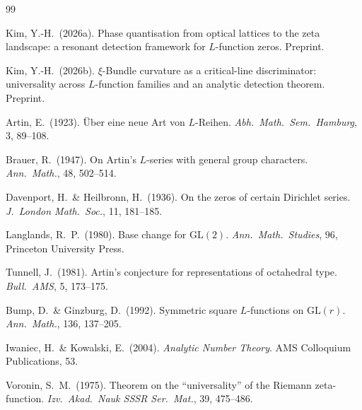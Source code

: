 \documentclass[11pt, a4paper]{article}
\theoremstyle{plain}
\theoremstyle{definition}
\begin{document}
\begin{thebibliography}{99}

  Kim, Y.-H.\ (2026a).
  Phase quantisation from optical lattices to the zeta landscape:
  a resonant detection framework for $L$-function zeros.
  Preprint.

  Kim, Y.-H.\ (2026b).
  $\xi$-Bundle curvature as a critical-line discriminator:
  universality across $L$-function families and an analytic detection theorem.
  Preprint.

  Artin, E.\ (1923).
  \"Uber eine neue Art von $L$-Reihen.
  \textit{Abh.\ Math.\ Sem.\ Hamburg}, 3, 89--108.

  Brauer, R.\ (1947).
  On Artin's $L$-series with general group characters.
  \textit{Ann.\ Math.}, 48, 502--514.

  Davenport, H.\ \& Heilbronn, H.\ (1936).
  On the zeros of certain Dirichlet series.
  \textit{J.\ London Math.\ Soc.}, 11, 181--185.

  Langlands, R.~P.\ (1980).
  Base change for $\mathrm{GL}(2)$.
  \textit{Ann.\ Math.\ Studies}, 96, Princeton University Press.

  Tunnell, J.\ (1981).
  Artin's conjecture for representations of octahedral type.
  \textit{Bull.\ AMS}, 5, 173--175.

  Bump, D.\ \& Ginzburg, D.\ (1992).
  Symmetric square $L$-functions on $\mathrm{GL}(r)$.
  \textit{Ann.\ Math.}, 136, 137--205.

  Iwaniec, H.\ \& Kowalski, E.\ (2004).
  \textit{Analytic Number Theory}.
  AMS Colloquium Publications, 53.

  Voronin, S.~M.\ (1975).
  Theorem on the ``universality'' of the Riemann zeta-function.
  \textit{Izv.\ Akad.\ Nauk SSSR Ser.\ Mat.}, 39, 475--486.

\end{thebibliography}
\end{document}
